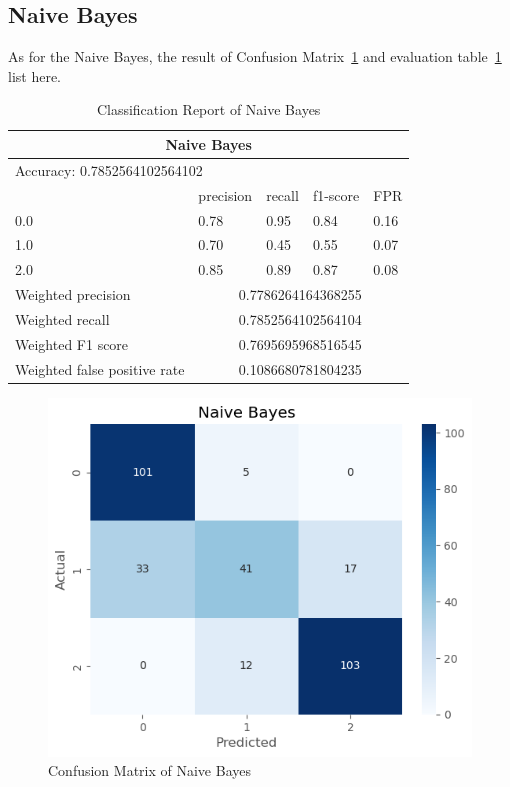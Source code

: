 \subsection{Naive Bayes}

As for the Naive Bayes, the result of Confusion Matrix~\ref*{cmnb} and evaluation table~\ref*{tablenb} list here.


\begin{table}[H]\centering
    \begin{tabular}{@{}lllll@{}}
    \toprule
    \multicolumn{5}{c}{Naive Bayes}                 \\ \midrule
    \multicolumn{5}{l}{Accuracy: 0.7852564102564102}       \\\midrule
                 & precision & recall & f1-score & FPR \\
    0.0         & 0.78      & 0.95   & 0.84     & 0.16      \\ 
    1.0          & 0.70      & 0.45   & 0.55     & 0.07     \\
    2.0       & 0.85      & 0.89   & 0.87     & 0.08     \\
    
    Weighted precision    & \multicolumn{4}{c}{0.7786264164368255}         \\
    Weighted recall    & \multicolumn{4}{c}{0.7852564102564104}          \\
    Weighted F1 score    & \multicolumn{4}{c}{0.7695695968516545}        \\
    Weighted false positive rate & \multicolumn{4}{c}{0.1086680781804235}  \\ \bottomrule
    \end{tabular}
    \caption{Classification Report of Naive Bayes}
    \label{tablenb}
    \end{table}

\begin{figure}[H]
    \includegraphics[scale=0.7]{imgs/nb}
    \centering
    \caption{Confusion Matrix of Naive Bayes}
    \label{cmnb}
\end{figure}


